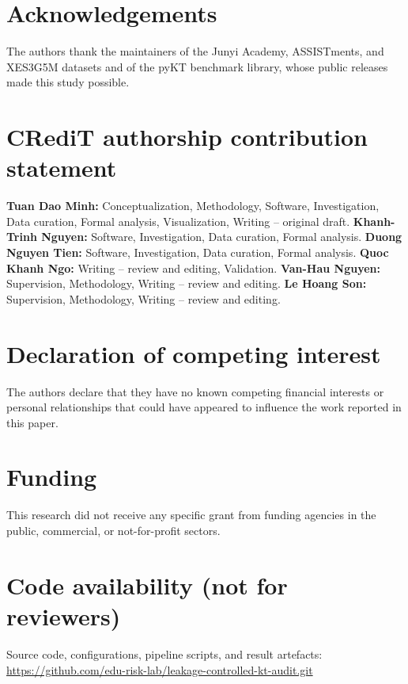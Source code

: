 \documentclass[preprint,12pt]{elsarticle}
\begin{document}
\section*{Acknowledgements}
The authors thank the maintainers of the Junyi Academy, ASSISTments, and
XES3G5M datasets and of the pyKT benchmark library, whose public releases
made this study possible.

\section*{CRediT authorship contribution statement}
\textbf{Tuan Dao Minh:} Conceptualization, Methodology, Software,
Investigation, Data curation, Formal analysis, Visualization,
Writing -- original draft.
\textbf{Khanh-Trinh Nguyen:} Software, Investigation, Data curation,
Formal analysis.
\textbf{Duong Nguyen Tien:} Software, Investigation, Data curation,
Formal analysis.
\textbf{Quoc Khanh Ngo:} Writing -- review and editing, Validation.
\textbf{Van-Hau Nguyen:} Supervision, Methodology, Writing -- review and
editing.
\textbf{Le Hoang Son:} Supervision, Methodology, Writing -- review and
editing.

\section*{Declaration of competing interest}
The authors declare that they have no known competing financial interests
or personal relationships that could have appeared to influence the work
reported in this paper.

\section*{Funding}
This research did not receive any specific grant from funding agencies in
the public, commercial, or not-for-profit sectors.

\section*{Code availability (not for reviewers)}
Source code, configurations, pipeline scripts, and result artefacts:
\url{https://github.com/edu-risk-lab/leakage-controlled-kt-audit.git}
\end{document}
